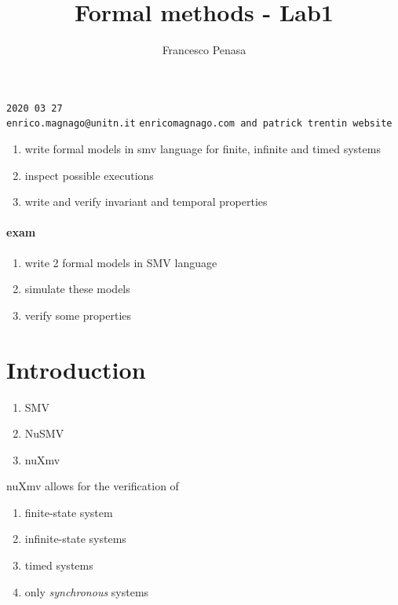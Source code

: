 \documentclass[11pt]{article}
\begin{document}
\author{Francesco Penasa}
\title{Formal methods - Lab1}
\maketitle

\medskip

\texttt{2020 03 27}\\
\texttt{enrico.magnago@unitn.it}
\texttt{enricomagnago.com and patrick trentin website}

\begin{enumerate}
	\item write formal models in smv language for finite, infinite and timed systems
	\item inspect possible executions
	\item write and verify invariant and temporal properties
\end{enumerate}


\paragraph{exam} %
\label{par:exam}
\begin{enumerate}
	\item write 2 formal models in SMV language
	\item simulate these models 
	\item verify some properties
\end{enumerate}

\section{Introduction} %
\label{sec:introduction}
\begin{enumerate}
	\item SMV
	\item NuSMV
	\item nuXmv
\end{enumerate}

nuXmv allows for the verification of
\begin{enumerate}
	\item finite-state system
	\item infinite-state systems
	\item timed systems
	\item only \textit{synchronous} systems
\end{enumerate}
\end{document}
